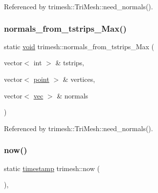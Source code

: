 Referenced by trimesh\+::\+Tri\+Mesh\+::need\+\_\+normals().

\mbox{\label{namespacetrimesh_a1d7c94dce3c861a15780c890a18c9e2c}} 
\subsubsection{\texorpdfstring{normals\+\_\+from\+\_\+tstrips\+\_\+\+Max()}{normals\_from\_tstrips\_Max()}}
{\footnotesize\ttfamily static \hyperlink{namespacetrimesh_a784ddfd979e1c579bda795a8edfc3f43}{void} trimesh\+::normals\+\_\+from\+\_\+tstrips\+\_\+\+Max (\begin{DoxyParamCaption}\item[{vector$<$ int $>$ \&}]{tstrips,  }\item[{vector$<$ \hyperlink{namespacetrimesh_a325b99fd6454b22fa4c4bc3223271b2c}{point} $>$ \&}]{vertices,  }\item[{vector$<$ \hyperlink{namespacetrimesh_a4fc2b83feba99c931f837a0c7d4b4df1}{vec} $>$ \&}]{normals }\end{DoxyParamCaption})\hspace{0.3cm}{\ttfamily [static]}}



Referenced by trimesh\+::\+Tri\+Mesh\+::need\+\_\+normals().

\mbox{\label{namespacetrimesh_a2bac0c9856bf384a1722af520298f84e}} 
\subsubsection{\texorpdfstring{now()}{now()}}
{\footnotesize\ttfamily static \hyperlink{namespacetrimesh_afc360812cb91ca27ac234664b59fe356}{timestamp} trimesh\+::now (\begin{DoxyParamCaption}{ }\end{DoxyParamCaption})\hspace{0.3cm}{\ttfamily [inline]}, {\ttfamily [static]}}



